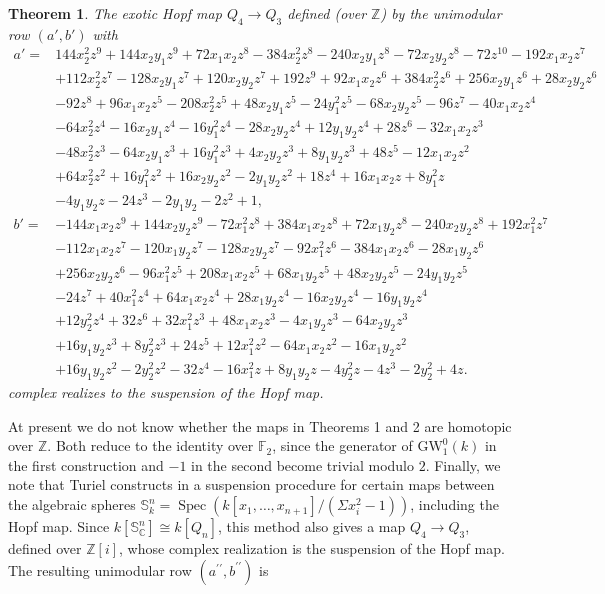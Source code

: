 \documentclass[11pt,leqno]{article}
\newcommand{\Spec}{\operatorname{Spec}}
\newcommand{\cplx}{{\mathbb C}}
\newcommand{\Z}{{\mathbb Z}}
\renewcommand{\1}{{\rm 1\hspace*{-0.4ex}%
\rule{0.1ex}{1.52ex}\hspace*{0.2ex}}}
\newcommand{\<}[1]{{\langle}#1 {\rangle}}
\newcounter{intro}
\theoremstyle{plain}
\newtheorem{thmintro}{Theorem}
\theoremstyle{definition}
\theoremstyle{remark}
\numberwithin{equation}{section}
\begin{document}
\begin{thmintro}
The exotic Hopf map $Q_4\to Q_3$ defined (over $\Z$) by the unimodular row $(a',b')$ with
\begin{align*}
a' =& 144x_2^2z^9+144x_2y_1z^9+72x_1x_2z^8-384x_2^2z^8-240x_2y_1z^8-72x_2 y_2z^8-72z^{10}-192x_1x_2z^7\\
&+112x_2^2z^7-128x_2y_1z^7+120x_2y_2z^7+192 z^9+92x_1x_2z^6+384x_2^2z^6+256x_2y_1z^6+28x_2y_2z^6\\
&-92z^8+96x_1x_2z ^5-208x_2^2z^5+48x_2y_1z^5-24y_1^2z^5-68x_2y_2z^5-96z^7-40x_1x_2z^4\\
&- 64x_2^2z^4-16x_2y_1z^4-16y_1^2z^4-28x_2y_2z^4+12y_1y_2z^4+28z^6-32 x_1x_2z^3\\
&-48x_2^2z^3-64x_2y_1z^3+16y_1^2z^3+4x_2y_2z^3+8y_1y_2z^3+48 z^5-12x_1x_2z^2\\
&+64x_2^2z^2+16y_1^2z^2+16x_2y_2z^2-2y_1y_2z^2+18z^4+16x_1x_2z+8y_1^2z\\
&-4y_1y_2z-24z^3-2y_1y_2-2z^2+1, \\
b' =& -144x_1x_2z^9+144x_2y_2z^9-72x_1^2z^8+384x_1x_2z^8+72x_1y_2z^8-240x_2 y_2z^8+192x_1^2z^7\\
&- 112x_1x_2z^7-120x_1y_2z^7-128x_2y_2z^7-92x_1^2z^6 -384x_1x_2z^6-28x_1y_2z^6\\
&+256x_2y_2z^6-96x_1^2z^5+208x_1x_2z^5+68x_1 y_2z^5+48x_2y_2z^5-24y_1y_2z^5\\
&-24z^7+40x_1^2z^4+64x_1x_2z^4+28x_1y_2 z^4-16x_2y_2z^4-16y_1y_2z^4\\
&+12y_2^2z^4+32z^6+32x_1^2z^3+48x_1x_2z^3- 4x_1y_2z^3-64x_2y_2z^3\\
&+16y_1y_2z^3+8y_2^2z^3+24z^5+12x_1^2z^2-64x_1 x_2z^2-16x_1y_2z^2\\
&+16y_1y_2z^2-2y_2^2z^2-32z^4-16x_1^2z+8y_1y_2z-4 y_2^2z-4z^3-2y_2^2+4z.
\end{align*}
complex realizes to the suspension of the Hopf map.
\end{thmintro}

At present we do not know whether the maps in Theorems 1 and 2 are homotopic over $\Z$. Both reduce to the identity over $\mathbb{F}_2$, since the generator of $\mathrm{GW}_1^0(k)$ in the first construction and $-1$ in the second become trivial modulo $2$. Finally, we note that Turiel constructs in \cite{Turiel07} a suspension procedure for certain maps between the algebraic spheres $\mathbb{S}_k^n=\Spec(k[x_1,\ldots,x_{n+1}]/(\Sigma x_i^2-1))$, including the Hopf map. Since $k[\mathbb{S}^{n}_\cplx]\cong k[Q_n]$, this method also gives a map $Q_4\to Q_3$, defined over $\Z[i]$, whose complex realization is the suspension of the Hopf map. The resulting unimodular row $(a^{\prime\prime},b^{\prime\prime})$ is
\end{document}

